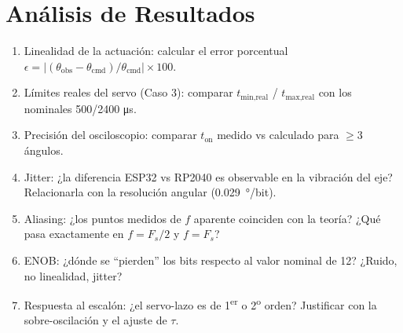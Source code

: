\documentclass[11pt]{article}
\begin{document}
\section{Análisis de Resultados}
\begin{enumerate}
  \item Linealidad de la actuación: calcular el error porcentual
        $\epsilon = \lvert(\theta_\text{obs}-\theta_\text{cmd})/\theta_\text{cmd}\rvert\times 100$.
  \item Límites reales del servo (Caso 3): comparar $t_\text{min,real}$ / $t_\text{max,real}$
        con los nominales 500/2400 \si{\micro\second}.
  \item Precisión del osciloscopio: comparar $t_\text{on}$ medido vs calculado para
        $\ge 3$ ángulos.
  \item Jitter: ¿la diferencia ESP32 vs RP2040 es observable en la vibración del eje?
        Relacionarla con la resolución angular (\SI{0.029}{\degree/bit}).
  \item Aliasing: ¿los puntos medidos de $f$ aparente coinciden con la teoría? ¿Qué pasa
        exactamente en $f=F_s/2$ y $f=F_s$?
  \item ENOB: ¿dónde se ``pierden'' los bits respecto al valor nominal de 12? ¿Ruido, no
        linealidad, jitter?
  \item Respuesta al escalón: ¿el servo-lazo es de 1\textsuperscript{er} o 2\textsuperscript{o}
        orden? Justificar con la sobre-oscilación y el ajuste de $\tau$.
\end{enumerate}

\end{document}
